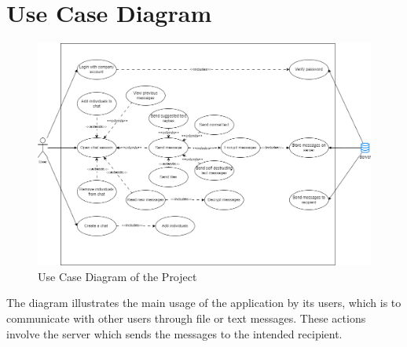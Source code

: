 \documentclass[]{article}
\begin{document}
\section{Use Case Diagram}
\label{sec:use_case_diagram}
\begin{figure}[H]
	\centering
	\includegraphics[width=1\textwidth]{figures/usecase.drawio.png}
	\caption{Use Case Diagram of the Project}
\end{figure}

The diagram illustrates the main usage of the application by its users, which is to communicate
with other users through file or text messages. These actions involve the server which sends the
messages to the intended recipient.


%
%
%
\end{document}
